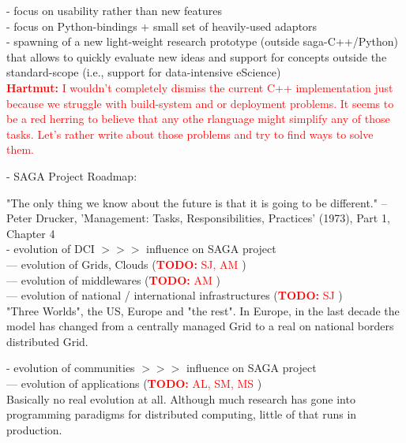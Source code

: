 \documentclass{article}
\newcommand{\B}[1]{\textbf{#1}}
\newcommand{\nind}{\noindent}
\newcommand{\todo}[1]{{\textcolor{red}{\B{TODO:} #1 }}}
\newcommand{\hknote}[1]{{\textcolor{red}{  \B{Hartmut: } #1 }}}
\newcommand{\hknote}[1]{}
\begin{document}
 - focus on usability rather than new features\\
 - focus on Python-bindings + small set of heavily-used adaptors\\
 - spawning of a new light-weight research prototype (outside saga-C++/Python) that allows to quickly evaluate new ideas and support for concepts outside the standard-scope (i.e., support for data-intensive eScience)\\

\hknote{I wouldn't completely dismiss the current C++ implementation just because
  we struggle with build-system and or deployment problems. It seems to be a 
  red herring to believe that any othe rlanguage might simplify any of those 
  tasks. Let's rather write about those problems and try to find ways to solve them.}


 \nind
 - SAGA Project Roadmap:\\

 
 \nind

 "The only thing we know about the future is that it is going to be
 different." -- Peter Drucker, 'Management: Tasks,
 Responsibilities, Practices' (1973), Part 1, Chapter 4\\ 


 - evolution of DCI $>>>$ influence on SAGA project\\
 --- evolution of Grids, Clouds (\todo{SJ, AM})\\
 --- evolution of middlewares (\todo{AM})\\
 --- evolution of national / international infrastructures (\todo{SJ})\\

"Three Worlds", the US, Europe and "the rest".
In Europe, in the last decade the model has changed from a centrally managed Grid to a real on national borders distributed Grid.

 
 \nind
 - evolution of communities  $>>>$ influence on SAGA project\\
 --- evolution of applications (\todo{AL, SM, MS})\\
 
Basically no real evolution at all. Although much research has gone into programming paradigms for distributed computing, little of that runs in production.
 
\end{document}
